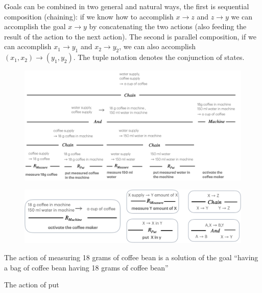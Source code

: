 Goals can be combined in two general and natural ways, the first is sequential composition (chaining): if we know how to accomplish $x\to z$ and $z\to y$ we can accomplish the goal $x \to y$ by concatenating the two actions (also feeding the result of the action to the next action). The second is parallel composition, if we can accomplish $x_1 \to y_1$ and $x_2 \to y_2$, we can also accomplish $(x_1,x_2) \to (y_1,y_2)$. The tuple notation denotes the conjunction of states. 

\begin{figure}
    \centering 
    \includegraphics[width=0.9\linewidth]{coffee.png}
    \caption{}
    \label{fig: coffee}
\end{figure}

\begin{figure}
    \centering 
    \includegraphics[width=0.9\linewidth]{coffee rule.png}
    \caption{}
    \label{fig: coffee rule}
\end{figure}

The action of measuring 18 grams of coffee bean is a solution of the goal  ``having a bag of coffee bean \to having 18 grams of coffee bean''

The action of put 


